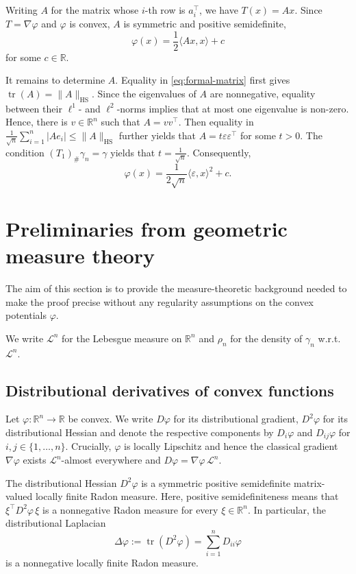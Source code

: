 \documentclass[11pt]{amsart}
\theoremstyle{definition}
\newcommand{\R}{\mathbb{R}}
\newcommand{\tr}{\operatorname{tr}}
\begin{document}
Writing $A$ for the matrix whose $i$-th row is $a_i^\top$, we have 
$
    T(x)=Ax.
$
Since $T=\nabla\varphi$ and $\varphi$ is convex, $A$ is symmetric and
positive semidefinite,
\[
    \varphi(x)
    =
    \frac12\langle Ax,x\rangle+c
\]
for some $c\in\R$.

It remains to determine $A$. Equality in
\eqref{eq:formal-matrix} first gives
$
    \tr(A)=\|A\|_{\mathrm{HS}}.
$
Since the eigenvalues of $A$ are nonnegative, equality between their
$\ell^1$- and $\ell^2$-norms implies that at most one eigenvalue is non-zero. Hence, there is $v\in\R^n$ such that 
$
    A=vv^\top. 
$
Then equality in $\frac{1}{\sqrt n}\sum_{i=1}^n |Ae_i|
    \leq
    \|A\|_{\mathrm{HS}}$
further yields that 
$
    A= t \varepsilon\varepsilon^\top
$
for some $t>0$. The condition $(T_1)_\#\gamma_n=\gamma$ yields that $t =\frac1{\sqrt n}$. 
Consequently,
\[
    \varphi(x)
    =
    \frac1{2\sqrt n}\langle\varepsilon,x\rangle^2+c.
\]




\section{Preliminaries from geometric measure theory}
\label{sec:bv}
The aim of this section is to provide the measure-theoretic background needed to make the proof precise without any regularity assumptions on the convex potentials $\varphi$.

We write $\mathcal L^n$ for the Lebesgue measure on $\R^n$ and $\rho_n$ for the density of $\gamma_n$ w.r.t.\ $\mathcal L^n$. 

\subsection{Distributional derivatives of convex functions}

Let $\varphi:\mathbb R^n\to\mathbb R$ be convex. We write $D\varphi$ for its distributional gradient, $D^2\varphi$ for its distributional Hessian and denote the respective components by $D_i\varphi$ and $D_{ij}\varphi$ for $i,j \in \{1,\dots,n\}$. Crucially, $\varphi$ is
locally Lipschitz and hence the classical gradient $\nabla\varphi$ exists $\mathcal L^n$-almost
everywhere and $ D\varphi=\nabla\varphi\,\mathcal L^n$. 

The distributional Hessian $D^2\varphi$  is a symmetric positive semidefinite matrix-valued locally finite Radon
measure. Here, positive semidefiniteness means that
$
    \xi^\top D^2\varphi\,\xi
$
is a nonnegative Radon measure for every $\xi\in\R^n$. In
particular, the distributional Laplacian
\[
    \Delta\varphi
    :=
    \operatorname{tr}(D^2\varphi)
    =
    \sum_{i=1}^n D_{ii}\varphi
\]
is a nonnegative locally finite Radon measure.
\end{document}
